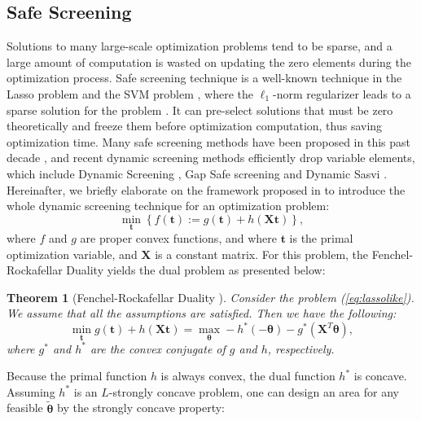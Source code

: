 \documentclass[twoside]{article}
\theoremstyle{plain}
\newtheorem{thm}{Theorem}
\newcommand{\mat}[1]{\mathbf{#1}}
\renewcommand{\vec}[1]{\bm{#1}}
\begin{document}
\subsection{Safe Screening}
Solutions to many large-scale optimization problems tend to be sparse, and a large amount of computation is wasted on updating the zero elements during the optimization process. Safe screening technique is a well-known technique in the Lasso problem and the SVM problem \citep{Ogawa_ICML_2013}, where the $\ell_1$-norm regularizer leads to a sparse solution for the problem \citep{ghaoui2010safe}. It can pre-select solutions that must be zero theoretically and freeze them before optimization computation, thus saving optimization time. Many safe screening methods have been proposed in this past decade \citep{Liu_ICML_2014,Wang_JMLR_2015}, and recent dynamic screening methods efficiently drop variable elements, which include Dynamic Screening \citep{7128732}, Gap Safe screening \citep{JMLR:v18:16-577} and Dynamic Sasvi \citep{Yamada_NIPS_2021}.
%
Hereinafter, we briefly elaborate on the framework proposed in \citep{Yamada_NIPS_2021} to introduce the whole dynamic screening technique for an optimization problem:
\begin{equation}
\label{eq:lassolike}
\min_{\vec{t}} \left\{ f(\vec{t}) := g(\vec{t}) + h(\mat{X} \vec{t}) \right\},
\end{equation}
where $f$ and $g$ are proper convex functions, and where $\vec{t}$ is the primal optimization variable, and $\mat{X}$ is a constant matrix. For this problem, the Fenchel-Rockafellar Duality yields the dual problem as presented below:
\begin{thm}[Fenchel-Rockafellar Duality {\citep{Rockafellar_Springer_1998}}]
\label{Thm:FRD} 
Consider the problem (\ref{eq:lassolike}). We assume that all the assumptions are satisfied. 
Then we have the following:
\begin{equation}
\label{Eq:FRD}
\min_{\vec{t}} g(\vec{t}) + h(\mat{X}\vec{t}) = \max_{\vec{\vec{\theta}}} -h^*(-\vec{\theta})-g^*(\mat{X}^T\vec{\theta}),
\end{equation}
where $g^*$ and $h^*$ are the convex conjugate of $g$ and $h$, respectively.
\end{thm}

Because the primal function $h$ is always convex, the dual function $h^*$ is concave. Assuming $h^*$ is an $L$-strongly concave problem, one can design an area for any feasible $\tilde{\vec{\theta}}$ by the strongly concave property:
\end{document}
